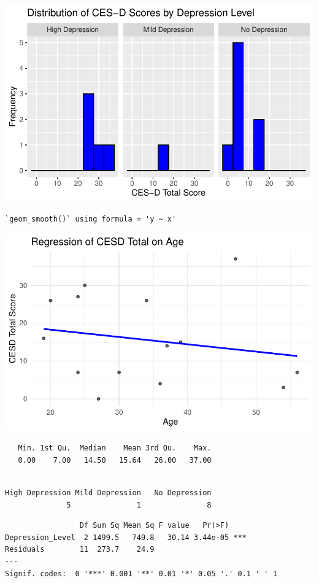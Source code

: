 \documentclass[
]{article}
\begin{document}
\includegraphics{SE-SCC-Depression_files/figure-pdf/CESD-total-versus-level-1.pdf}

\begin{verbatim}
`geom_smooth()` using formula = 'y ~ x'
\end{verbatim}

\includegraphics{SE-SCC-Depression_files/figure-pdf/CESD-total-versus-age-1.pdf}

\begin{verbatim}
   Min. 1st Qu.  Median    Mean 3rd Qu.    Max. 
   0.00    7.00   14.50   15.64   26.00   37.00 
\end{verbatim}

\begin{verbatim}

High Depression Mild Depression   No Depression 
              5               1               8 
\end{verbatim}

\begin{verbatim}
                 Df Sum Sq Mean Sq F value   Pr(>F)    
Depression_Level  2 1499.5   749.8   30.14 3.44e-05 ***
Residuals        11  273.7    24.9                     
---
Signif. codes:  0 '***' 0.001 '**' 0.01 '*' 0.05 '.' 0.1 ' ' 1
\end{verbatim}
\end{document}
